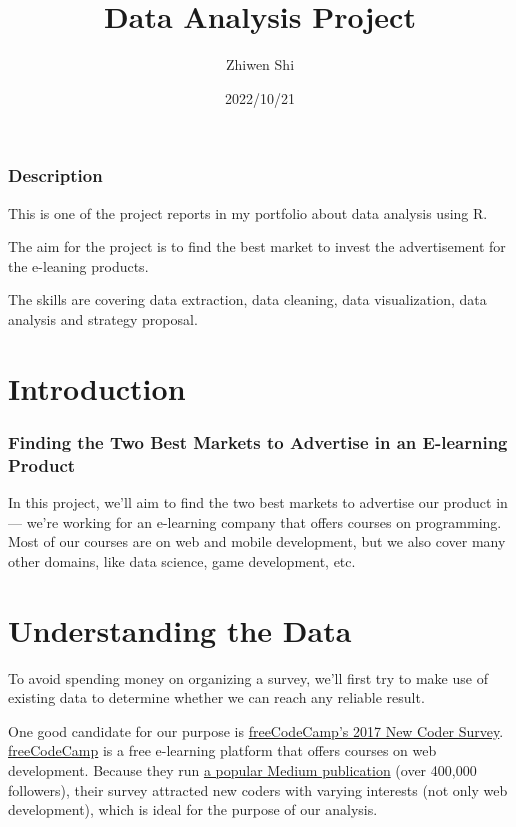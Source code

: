 \documentclass[
]{article}
\title{Data Analysis Project}
\author{Zhiwen Shi}
\date{2022/10/21}
\begin{document}
\maketitle

\hypertarget{description}{%
\subsubsection{Description}\label{description}}

This is one of the project reports in my portfolio about data analysis
using R.

The aim for the project is to find the best market to invest the
advertisement for the e-leaning products.

The skills are covering data extraction, data cleaning, data
visualization, data analysis and strategy proposal.

\hypertarget{introduction}{%
\section{Introduction}\label{introduction}}

\hypertarget{finding-the-two-best-markets-to-advertise-in-an-e-learning-product}{%
\subsubsection{Finding the Two Best Markets to Advertise in an
E-learning
Product}\label{finding-the-two-best-markets-to-advertise-in-an-e-learning-product}}

In this project, we'll aim to find the two best markets to advertise our
product in --- we're working for an e-learning company that offers
courses on programming. Most of our courses are on web and mobile
development, but we also cover many other domains, like data science,
game development, etc.

\hypertarget{understanding-the-data}{%
\section{Understanding the Data}\label{understanding-the-data}}

To avoid spending money on organizing a survey, we'll first try to make
use of existing data to determine whether we can reach any reliable
result.

One good candidate for our purpose is
\href{https://medium.freecodecamp.org/we-asked-20-000-people-who-they-are-and-how-theyre-learning-to-code-fff5d668969}{freeCodeCamp's
2017 New Coder Survey}.
\href{https://www.freecodecamp.org/}{freeCodeCamp} is a free e-learning
platform that offers courses on web development. Because they run
\href{https://medium.freecodecamp.org/}{a popular Medium publication}
(over 400,000 followers), their survey attracted new coders with varying
interests (not only web development), which is ideal for the purpose of
our analysis.
\end{document}
